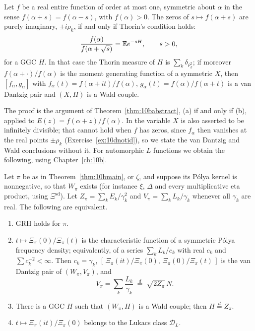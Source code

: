 \begin{theorem}\label{thm:10dduality}
Let $f$ be a real entire function of order at most one, symmetric about $\alpha$ in the sense $f(\alpha+s) = f(\alpha-s)$, with $f(\alpha)>0$. The zeros of $s\mapsto f(\alpha+s)$ are purely imaginary, $\pm i\rho_k$, if and only if Thorin's condition holds:
\[
\frac{f(\alpha)}{f(\alpha+\sqrt s)} = \mathbb{E} e^{-sH},\qquad s>0,
\]
for a GGC $H$. In that case the Thorin measure of $H$ is $\sum_k\delta_{\rho_k^2}$; if moreover $f(\alpha+\cdot)/f(\alpha)$ is the moment generating function of a symmetric $X$, then $[f_\alpha,g_\alpha]$ with $f_\alpha(t) = f(\alpha+it)/f(\alpha)$, $g_\alpha(t) = f(\alpha)/f(\alpha+t)$ is a van Dantzig pair and $(X,H)$ is a Wald couple.
\end{theorem}

The proof is the argument of Theorem~\ref{thm:10babstract}, (a) if and only if (b), applied to $E(z) = f(\alpha+z)/f(\alpha)$. In \cite{polson2018vdp} the variable $X$ is also asserted to be infinitely divisible; that cannot hold when $f$ has zeros, since $f_\alpha$ then vanishes at the real points $\pm\rho_k$ (Exercise~\ref{ex:10dnotid}), so we state the van Dantzig and Wald conclusions without it. For automorphic $L$ functions we obtain the following, using Chapter~\ref{ch:10b}.

\begin{theorem}\label{thm:10dvdp}
Let $\pi$ be as in Theorem~\ref{thm:10bmain}, or $\zeta$, and suppose its P\'olya kernel is nonnegative, so that $W_\pi$ exists (for instance $\xi$, $\Delta$ and every multiplicative eta product, using $\Xi^{\mathrm{sd}}$). Let $Z_\pi = \sum_kE_k/\gamma_k^2$ and $V_\pi = \sum_kL_k/\gamma_k$ whenever all $\gamma_k$ are real. The following are equivalent.
\begin{enumerate}
\item[(a)] GRH holds for $\pi$.
\item[(b)] $t\mapsto\Xi_\pi(0)/\Xi_\pi(t)$ is the characteristic function of a symmetric P\'olya frequency density; equivalently, of a series $\sum_kL_k/c_k$ with real $c_k$ and $\sum c_k^{-2}<\infty$. Then $c_k = \gamma_k$, $[\,\Xi_\pi(it)/\Xi_\pi(0),\,\Xi_\pi(0)/\Xi_\pi(t)\,]$ is the van Dantzig pair of $(W_\pi,V_\pi)$, and
\[
V_\pi = \sum_k\frac{L_k}{\gamma_k}\;\overset{d}{=}\;\sqrt{2Z_\pi}\,N .
\]
\item[(c)] There is a GGC $H$ such that $(W_\pi,H)$ is a Wald couple; then $H\overset d= Z_\pi$.
\item[(d)] $t\mapsto\Xi_\pi(it)/\Xi_\pi(0)$ belongs to the Lukacs class $\mathcal D_L$.
\end{enumerate}
\end{theorem}

